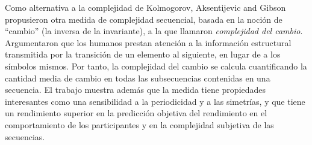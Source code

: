 Como alternativa a la complejidad de Kolmogorov, Aksentijevic and Gibson \cite{f47} propusieron otra medida de complejidad secuencial, basada en la noción de ``cambio'' (la inversa de la invariante), a la que llamaron \textit{complejidad del cambio}. Argumentaron que los humanos prestan atención a la información estructural transmitida por la transición de un elemento al siguiente, en lugar de a los símbolos mismos. Por tanto, la complejidad del cambio se calcula cuantificando la cantidad media de cambio en todas las subsecuencias contenidas en una secuencia. El trabajo muestra además que la medida tiene propiedades interesantes como una sensibilidad a la periodicidad y a las simetrías, y que tiene un rendimiento superior en la predicción objetiva del rendimiento en el comportamiento de los participantes y en la complejidad subjetiva de las secuencias.


